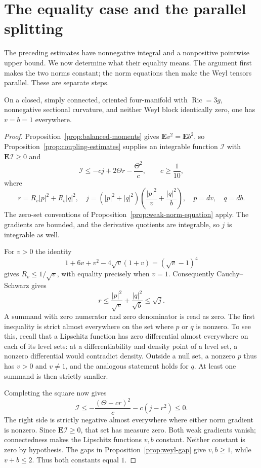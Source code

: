 \section{The equality case and the parallel splitting}
\label{sec:classification}

The preceding estimates have nonnegative integral and a nonpositive
pointwise upper bound. We now determine what their equality means.
The argument first makes the two norms constant; the norm equations
then make the Weyl tensors parallel. These are separate steps.

\begin{proposition}
\label{prop:constant-norms}
On a closed, simply connected, oriented four-manifold with
$\operatorname{Ric}=3g$, nonnegative sectional curvature, and neither
Weyl block identically zero, one has $v=b=1$ everywhere.
\end{proposition}
\begin{proof}
Proposition~\ref{prop:balanced-moments} gives
$\mathbf E v^2=\mathbf E b^2$, so
Proposition~\ref{prop:coupling-estimates} supplies an integrable
function $\mathcal I$ with $\mathbf E\mathcal I\ge0$ and
\[
 \mathcal I\le-cj+2\Theta r-\frac{\Theta^2}{c},\qquad
 c\ge\frac1{10},
\]
where
\[
 r=R_v|p|^2+R_b|q|^2,\quad
 j=(|p|^2+|q|^2)\left(\frac{|p|^2}{v}+\frac{|q|^2}{b}\right),
 \quad p=dv,\quad q=db.
\]
The zero-set conventions of Proposition~\ref{prop:weak-norm-equation}
apply. The gradients are bounded, and the derivative quotients are
integrable, so $j$ is integrable as well.

For $v>0$ the identity
\[
 1+6v+v^2-4\sqrt v(1+v)=(\sqrt v-1)^4
\]
gives $R_v\le1/\sqrt v$, with equality precisely when $v=1$.
Consequently Cauchy--Schwarz gives
\[
 r\le\frac{|p|^2}{\sqrt v}+\frac{|q|^2}{\sqrt b}\le\sqrt j.
\]
A summand with zero numerator and zero denominator is read as zero.
The first inequality is strict almost everywhere on the set where
$p$ or $q$ is nonzero. To see this, recall that a Lipschitz function has
zero differential almost everywhere on each of its level sets: at a
differentiability and density point of a level set, a nonzero
differential would contradict density. Outside a null set, a nonzero
$p$ thus has $v>0$ and $v\ne1$, and the analogous statement holds for
$q$. At least one summand is then strictly smaller.

Completing the square now gives
\[
 \mathcal I\le-\frac{(\Theta-cr)^2}{c}-c(j-r^2)\le0.
\]
The right side is strictly negative almost everywhere where either
norm gradient is nonzero. Since $\mathbf E\mathcal I\ge0$, that set
has measure zero. Both weak gradients vanish; connectedness makes the
Lipschitz functions $v,b$ constant. Neither constant is zero by
hypothesis. The gaps in Proposition~\ref{prop:weyl-gap} give
$v,b\ge1$, while $v+b\le2$. Thus both constants equal $1$.
\end{proof}

